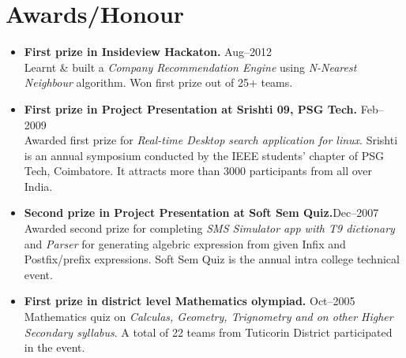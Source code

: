 \documentclass{cv}
\begin{document}
\section{Awards/Honour}
\begin{itemize}[label={$\ast$}]
  \item \textbf{First prize in Insideview Hackaton.} \hfill Aug--2012\\
    Learnt \& built a \textit{Company Recommendation Engine} using \textit{N-Nearest Neighbour} algorithm.  Won first prize out of 25+ teams.
  \item \textbf{First prize in Project Presentation at Srishti 09, PSG Tech.} \hfill Feb--2009\\
    Awarded first prize for \textit{Real-time Desktop search application for linux}. Srishti is an annual symposium conducted by the IEEE students' chapter of PSG Tech, Coimbatore.  It attracts more than 3000 participants from all over India.
  \item \textbf{Second prize in Project Presentation at Soft Sem Quiz.}\hfill Dec--2007\\
    Awarded second prize for completing \textit{SMS Simulator app with T9 dictionary} and \textit{Parser} for generating algebric expression from given Infix and Postfix/prefix expressions.  Soft Sem Quiz is the annual intra college technical event.
  \item \textbf{First prize in district level Mathematics olympiad.} \hfill Oct--2005\\
    Mathematics quiz on \textit{Calculas, Geometry, Trignometry and on other Higher Secondary syllabus}.  A total of 22 teams from Tuticorin District participated in the event.
\end{itemize}
\end{document}
